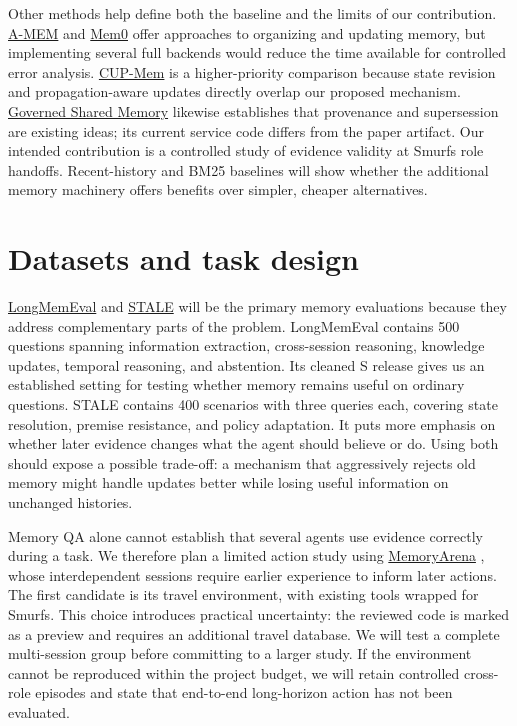 \documentclass[a4paper,11pt]{article}
\begin{document}
Other methods help define both the baseline and the limits of our contribution. \href{https://github.com/agiresearch/A-mem}{A-MEM} \cite{amem2025} and \href{https://github.com/mem0ai/mem0}{Mem0} \cite{mem02025} offer approaches to organizing and updating memory, but implementing several full backends would reduce the time available for controlled error analysis. \href{https://github.com/icedreamc/STALE/tree/main/cup_mem}{CUP-Mem} \cite{stale2026} is a higher-priority comparison because state revision and propagation-aware updates directly overlap our proposed mechanism. \href{https://github.com/caura-ai/caura}{Governed Shared Memory} \cite{governed2026} likewise establishes that provenance and supersession are existing ideas; its current service code differs from the paper artifact. Our intended contribution is a controlled study of evidence validity at Smurfs role handoffs. Recent-history and BM25 baselines will show whether the additional memory machinery offers benefits over simpler, cheaper alternatives.\par

\clearpage
\section{Datasets and task design}
\href{https://github.com/xiaowu0162/LongMemEval}{LongMemEval} \cite{longmemeval2025} and \href{https://github.com/icedreamc/STALE}{STALE} \cite{stale2026} will be the primary memory evaluations because they address complementary parts of the problem. LongMemEval contains 500 questions spanning information extraction, cross-session reasoning, knowledge updates, temporal reasoning, and abstention. Its cleaned S release gives us an established setting for testing whether memory remains useful on ordinary questions. STALE contains 400 scenarios with three queries each, covering state resolution, premise resistance, and policy adaptation. It puts more emphasis on whether later evidence changes what the agent should believe or do. Using both should expose a possible trade-off: a mechanism that aggressively rejects old memory might handle updates better while losing useful information on unchanged histories.\par

Memory QA alone cannot establish that several agents use evidence correctly during a task. We therefore plan a limited action study using \href{https://github.com/ZexueHe/MemoryArena}{MemoryArena} \cite{memoryarena2026}, whose interdependent sessions require earlier experience to inform later actions. The first candidate is its travel environment, with existing tools wrapped for Smurfs. This choice introduces practical uncertainty: the reviewed code is marked as a preview and requires an additional travel database. We will test a complete multi-session group before committing to a larger study. If the environment cannot be reproduced within the project budget, we will retain controlled cross-role episodes and state that end-to-end long-horizon action has not been evaluated.\par
\end{document}

